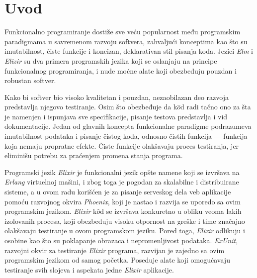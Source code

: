 \documentclass[12pt,oneside]{memoir}
\begin{document}
\frontmatter
\naslovna
\komisija
\apstrakt
\tableofcontents*

\mainmatter

\chapter{Uvod}
\par Funkcionalno programiranje dostiže sve veću popularnost među programskim paradigmama u savremenom razvoju softvera, zahvaljući konceptima kao što su imutabilnost, čiste funkcije i koncizan, deklarativan stil pisanja koda. Jezici \emph{Elm} i \emph{Elixir} su dva primera programskih jezika koji se oslanjaju na principe funkcionalnog programiranja, i nude moćne alate koji obezbeđuju pouzdan i robustan softver. 
\par Kako bi softver bio visoko kvalitetan i pouzdan, nezaobilazan deo razvoja predstavlja njegovo testiranje. Osim što obezbeđuje da k$\hat{o}$d radi tačno ono za šta je namenjen i ispunjava sve specifikacije, pisanje testova predstavlja i vid dokumentacije. Jedan od glavnih koncepta funkcionalne paradigme podrazumeva imutabilnost podataka i pisanje čistog koda, odnosno čistih funkcija --- funkcija koja nemaju propratne efekte. Čiste funkcije olakšavaju proces testiranja, jer eliminišu potrebu za praćenjem promena stanja programa. 
\par Programski jezik \emph{Elixir} je funkcionalni jezik opšte namene koji se izvršava na \emph{Erlang} virtuelnoj mašini, i zbog toga je pogodan za skalabilne i distribuirane sisteme, a u ovom radu korišćen je za pisanje serveskog dela veb aplikacije pomoću razvojnog okvira \emph{Phoenix}, koji je nastao i razvija se uporedo sa ovim programskim jezikom. \emph{Elixir} k$\hat{o}$d se izvršava konkuretno u obliku veoma lakih izolovanih procesa, koji obezbeđuju visoku otpornost na greške i time značajno olakšavaju testiranje u ovom programskom jeziku. Pored toga, \emph{Elixir} odlikuju i osobine kao što su poklapanje obrazaca i nepromenljivost podataka. \emph{ExUnit}, razvojni okvir za testiranje \emph{Elixir} programa, razvijan je zajedno sa ovim programskim jezikom od samog početka. Poseduje alate koji omogućavaju testiranje svih slojeva i aspekata jedne \emph{Elixir} aplikacije.
\end{document}
